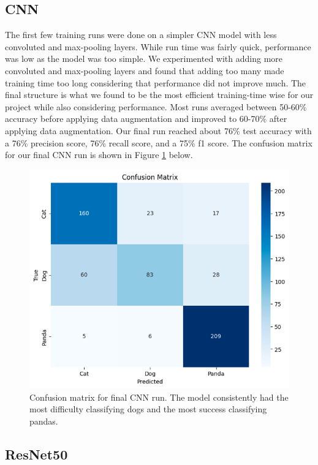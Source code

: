 \subsection{CNN}
The first few training runs were done on a simpler CNN model with less convoluted and max-pooling layers. While run time was fairly quick, performance was low as the model was too simple. We experimented with adding more convoluted and max-pooling layers and found that adding too many made training time too long considering that performance did not improve much. The final structure is what we found to be the most efficient training-time wise for our project while also considering performance. Most runs averaged between 50-60\% accuracy before applying data augmentation and improved to 60-70\% after applying data augmentation. Our final run reached about 76\% test accuracy with a 76\% precision score, 76\% recall score, and a 75\% f1 score. The confusion matrix for our final CNN run is shown in Figure \ref{fig:figure4} below.

\begin{figure}[h]
	\centering
	\includegraphics[scale=0.5]{CNN_cfm}
	\caption{Confusion matrix for final CNN run. The model consistently had the most difficulty classifying dogs and the most success classifying pandas.}
	\label{fig:figure4}
\end{figure}

\subsection{ResNet50}

